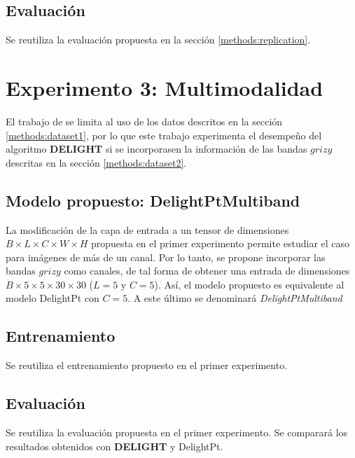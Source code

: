 \documentclass[../tesis.tex]{subfiles}
\begin{document}
\subsection{Evaluación}
Se reutiliza la evaluación propuesta en la sección \ref{methods:replication}.

\section{Experimento 3: Multimodalidad}\label{methods:multimodality}
El trabajo de \cite{delight} se limita al uso de los datos descritos en la sección \ref{methods:dataset1}, por lo que este trabajo experimenta el desempeño del algoritmo \textbf{DELIGHT} si se incorporasen la información de las bandas $grizy$ descritas en la sección \ref{methods:dataset2}. 

\subsection{Modelo propuesto: DelightPtMultiband}
La modificación de la capa de entrada a un tensor de dimensiones $B\times L\times C\times W\times H$ propuesta en el primer experimento permite estudiar el caso para imágenes de más de un canal. Por lo tanto, se propone incorporar las bandas $grizy$ como canales, de tal forma de obtener una entrada de dimensiones $B\times5\times5\times30\times30$ ($L=5$ y $C=5$). Así, el modelo propuesto es equivalente al modelo DelightPt con $C=5$. A este último se denominará \textit{DelightPtMultiband}\par\null\par

\subsection{Entrenamiento}
Se reutiliza el entrenamiento propuesto en el primer experimento.\par\null\par

\subsection{Evaluación}
Se reutiliza la evaluación propuesta en el primer experimento. Se comparará los resultados obtenidos con \textbf{DELIGHT} y DelightPt.\par\null\par
\end{document}
